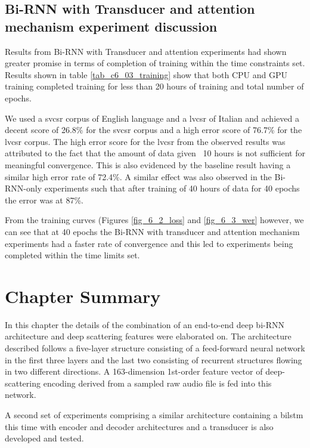\subsection{Bi-RNN with Transducer and attention mechanism experiment discussion}
Results from Bi-RNN with Transducer and attention experiments had shown greater promise in terms of completion of training within the time constraints set. Results shown in table \ref{tab_c6_03_training} show that both CPU and GPU training completed training for less than 20 hours of training and total number of epochs.

We used a \acrfull{svcsr} corpus of English language and a \acrfull{lvcsr} of Italian and achieved a decent score of 26.8\% for the \acrshort{svcsr} corpus and a high error score of 76.7\% for the \acrshort{lvcsr} corpus.  The high error score for the \acrshort{lvcsr} from the observed results was attributed to the fact that the amount of data given ~10 hours is not sufficient for meaningful convergence.  This is also evidenced by the baseline result having a similar high error rate of 72.4\%.  A similar effect was also observed in the Bi-RNN-only experiments such that after training of 40 hours of data for 40 epochs the error was at 87\%.

From the training curves (Figures \ref{fig_6_2_loss} and \ref{fig_6_3_wer} however, we can see that at 40 epochs the Bi-RNN with transducer and attention mechanism experiments had a faster rate of convergence and this led to experiments being completed within the time limits set.

\section{Chapter Summary}

In this chapter the details of the combination of an end-to-end deep bi-RNN architecture and deep scattering features were elaborated on.  The architecture described follows a five-layer structure consisting of a feed-forward neural network in the first three layers and the last two consisting of recurrent structures flowing in two different directions.  A 163-dimension 1st-order feature vector of deep-scattering encoding derived from a sampled raw audio file is fed into this network.

A second set of experiments comprising a similar architecture containing a \acrshort{bilstm} this time with encoder and decoder architectures and a transducer is also developed and tested.


